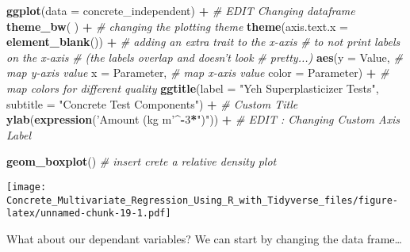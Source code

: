 \documentclass[]{article}
\newenvironment{Shaded}{\begin{snugshade}}{\end{snugshade}}
\newcommand{\CommentTok}[1]{\textcolor[rgb]{0.56,0.35,0.01}{\textit{#1}}}
\newcommand{\DataTypeTok}[1]{\textcolor[rgb]{0.13,0.29,0.53}{#1}}
\newcommand{\DecValTok}[1]{\textcolor[rgb]{0.00,0.00,0.81}{#1}}
\newcommand{\KeywordTok}[1]{\textcolor[rgb]{0.13,0.29,0.53}{\textbf{#1}}}
\newcommand{\NormalTok}[1]{#1}
\newcommand{\OperatorTok}[1]{\textcolor[rgb]{0.81,0.36,0.00}{\textbf{#1}}}
\newcommand{\StringTok}[1]{\textcolor[rgb]{0.31,0.60,0.02}{#1}}
\begin{document}
\begin{Shaded}
\begin{Highlighting}[]
\KeywordTok{ggplot}\NormalTok{(}\DataTypeTok{data =}\NormalTok{ concrete_independent) }\OperatorTok{+}\StringTok{      }\CommentTok{# EDIT Changing dataframe}
\StringTok{  }
\StringTok{  }\KeywordTok{theme_bw}\NormalTok{( ) }\OperatorTok{+}\StringTok{                            }\CommentTok{# changing the plotting theme}
\StringTok{  }
\StringTok{  }\KeywordTok{theme}\NormalTok{(}\DataTypeTok{axis.text.x =} \KeywordTok{element_blank}\NormalTok{()) }\OperatorTok{+}\StringTok{   }\CommentTok{# adding an extra trait to the x-axis}
\StringTok{                                           }\CommentTok{# to not print labels on the x-axis }
\StringTok{                                           }\CommentTok{# (the labels overlap and doesn't look}
\StringTok{                                           }\CommentTok{# pretty...)}
\StringTok{  }
\StringTok{  }\KeywordTok{aes}\NormalTok{(}\DataTypeTok{y      =}\NormalTok{ Value,                     }\CommentTok{# map y-axis value}
      \DataTypeTok{x      =}\NormalTok{ Parameter,                 }\CommentTok{# map x-axis value}
      \DataTypeTok{color  =}\NormalTok{ Parameter) }\OperatorTok{+}\StringTok{               }\CommentTok{# map colors for different quality}
\StringTok{  }
\StringTok{  }\KeywordTok{ggtitle}\NormalTok{(}\DataTypeTok{label    =} \StringTok{"Yeh Superplasticizer Tests"}\NormalTok{,}
          \DataTypeTok{subtitle =} \StringTok{"Concrete Test Components"}\NormalTok{) }\OperatorTok{+}\StringTok{ }\CommentTok{# Custom Title}
\StringTok{  }
\StringTok{  }\KeywordTok{ylab}\NormalTok{(}\KeywordTok{expression}\NormalTok{(}\StringTok{'Amount (kg m'}\OperatorTok{^-}\DecValTok{3}\OperatorTok{*}\StringTok{")"}\NormalTok{)) }\OperatorTok{+}\StringTok{ }\CommentTok{# EDIT : Changing Custom Axis Label}

\StringTok{  }\KeywordTok{geom_boxplot}\NormalTok{()                          }\CommentTok{# insert crete a relative density plot }
\end{Highlighting}
\end{Shaded}

\texttt{[image: Concrete\_Multivariate\_Regression\_Using\_R\_with\_Tidyverse\_files/figure-latex/unnamed-chunk-19-1.pdf]}

What about our dependant variables? We can start by changing the data
frame\ldots{}
\end{document}
